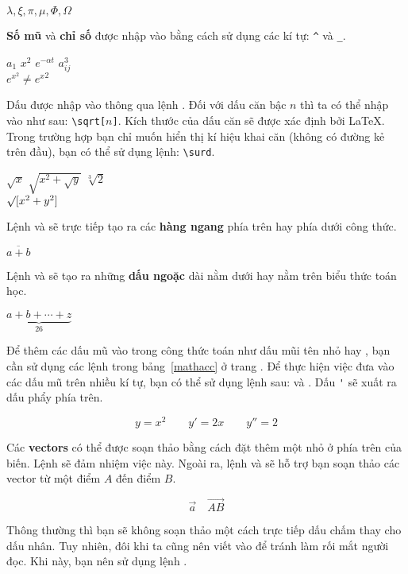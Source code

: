 \begin{example}
$\lambda,\xi,\pi,\mu,\Phi,\Omega$
\end{example}
\textbf{Số mũ} và \textbf{chỉ số} được nhập vào bằng cách sử dụng các kí tự: \verb|^| và \verb|_|.
\begin{example}
$a_{1}$ \qquad $x^{2}$ \qquad
$e^{-\alpha t}$ \qquad
$a^{3}_{ij}$\\
$e^{x^2} \neq {e^x}^2$
\end{example}

Dấu \textbf{} được nhập vào thông qua lệnh . Đối với dấu căn bậc $n$ thì ta có thể nhập
vào như sau: \verb|\sqrt[|$n$\verb|]|. Kích thước của dấu căn sẽ được xác định bởi \LaTeX{}. Trong trường hợp bạn chỉ muốn hiển thị kí hiệu khai căn (không có đường kẻ trên đầu), bạn có thể sử dụng lệnh: \verb|\surd|.
\begin{example}
$\sqrt{x}$ \qquad
$\sqrt{ x^{2}+\sqrt{y} }$
\qquad $\sqrt[3]{2}$\\[3pt]
$\surd[x^2 + y^2]$
\end{example}
Lệnh  và  sẽ trực tiếp tạo ra các \textbf{hàng ngang} phía trên hay phía dưới công thức.
\begin{example}
$\overline{a+b}$
\end{example}
Lệnh  và  sẽ tạo ra những \textbf{dấu ngoặc} dài nằm dưới hay nằm trên biểu thức toán học.
\begin{example}
$\underbrace{ a+b+\cdots+z }_{26}$
\end{example}

 Để thêm các dấu mũ vào trong công thức toán như dấu mũi tên nhỏ hay , bạn cần sử dụng các lệnh trong bảng~\ref{mathacc} ở trang \pageref{mathacc}. Để thực hiện việc đưa vào các dấu mũ trên nhiều kí tự, bạn có thể sử dụng lệnh sau:  và . Dấu \verb|'| sẽ xuất ra dấu phẩy phía trên.
\begin{example}
\begin{displaymath}
y=x^{2}\qquad y'=2x\qquad y''=2
\end{displaymath}
\end{example}

Các \textbf{vectors} có thể được soạn thảo bằng cách đặt thêm một  nhỏ ở phía trên của biến. Lệnh  sẽ đảm nhiệm việc này. Ngoài ra, lệnh  và  sẽ hỗ trợ bạn soạn thảo các vector từ một điểm $A$ đến điểm $B$.
\begin{example}
\begin{displaymath}
\vec a\quad\overrightarrow{AB}
\end{displaymath}
\end{example}
Thông thường thì bạn sẽ không soạn thảo một cách trực tiếp dấu chấm thay cho dấu nhân. Tuy nhiên, đôi khi ta cũng nên viết vào để tránh làm rối mắt người đọc. Khi này, bạn nên sử dụng lệnh .


